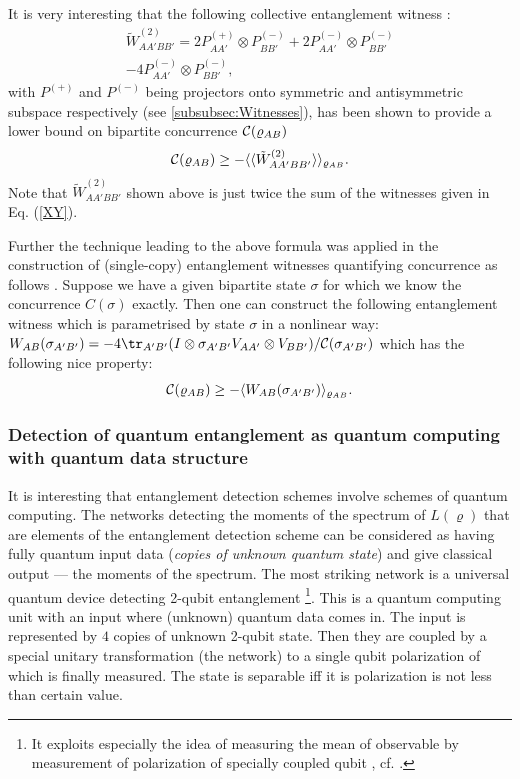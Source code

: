 \documentclass[twocolumn,aps,rmp]{revtex4}
\begin{document}
It is very interesting that the following collective
entanglement witness \cite{MintertBuchleitner}:
\begin{eqnarray}
\tilde{W}_{AA'BB'}^{(2)}=2P^{(+)}_{AA'} \otimes P^{(-)}_{BB'} + 2
P^{(-)}_{AA'} \otimes P^{(-)}_{BB'} \nonumber \\- 4P^{(-)}_{AA'} \otimes
P^{(-)}_{BB'},
 \label{ConcurrenceWitness}
\end{eqnarray}
with $P^{(+)}$ and $P^{(-)}$ being projectors onto symmetric
and antisymmetric subspace respectively (see \ref{subsubsec:Witnesses}), has been shown to provide a
lower bound on bipartite concurrence  ${\cal
C}(\varrho_{AB})$ \cite{MintertKB04-conc}
\begin{eqnarray}
  {\cal C}(\varrho_{AB})\geq -\langle
 \langle \tilde{W}_{AA'BB'}^{(2)}\rangle\rangle_{\varrho_{AB}}.
 \label{con}
\end{eqnarray}
Note that $\tilde{W}_{AA'BB'}^{(2)}$ shown above is  just twice the sum
of the witnesses given in Eq. (\ref{XY}).

Further the technique leading to the above formula was applied in
the construction of   (single-copy) entanglement witnesses quantifying
concurrence as follows  \cite{Mintert2006}.
Suppose we have a given bipartite state $\sigma $ for which we know
the concurrence $C(\sigma)$ exactly.  Then one can construct the following
entanglement witness  which is parametrised by state $\sigma$ in a nonlinear
way:
$W_{AB}(\sigma_{A'B'})=-4\tr_{A'B'}(I \otimes \sigma_{A'B'}
 V_{AA'} \otimes V_{BB'})/{\cal C}(\sigma_{A'B'})$  which has the following
nice property:
\begin{equation}
{\cal C}(\varrho_{AB}) \geq - \langle W_{AB}(\sigma_{A'B'})
\rangle_{\varrho_{AB}}.
\end{equation}



\subsubsection{Detection of quantum entanglement as quantum computing
with quantum data structure \label{subsubsec:QuantumDataStructure}}

It is interesting that entanglement detection schemes involve
schemes of quantum computing. The networks detecting the moments of
the spectrum of $L(\varrho)$ that are elements of the entanglement
detection scheme \cite{PHAE,PHPRL,reshuff,Carteret} can be
considered as having fully quantum input data ({\it copies of
unknown quantum state}) and give classical output --- the moments of
the spectrum. The most striking network is a universal
quantum device detecting 2-qubit entanglement
\cite{Augusiak}\footnote{It exploits especially the idea of
measuring the mean of observable by measurement of polarization of
specially coupled qubit \cite{binpovm,PazRoncaglia}, cf.
\cite{Brun}.}. This is a quantum computing unit with an input where
(unknown) quantum data comes in. The input is represented by $4$
copies of unknown 2-qubit state. Then they are coupled by a special
unitary transformation (the network) to a single qubit polarization
of which is finally measured. The state is separable iff it is
polarization is not less than certain value.
\end{document}
